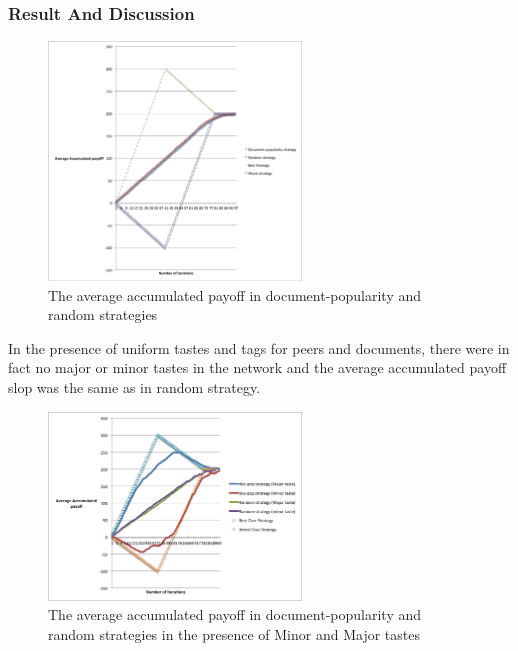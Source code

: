\documentclass [12pt]{article} \usepackage{multicol}
\begin{document}
\subsubsection{Result And Discussion}

\begin{figure}[h!]
\begin{center}
\includegraphics[width=0.6\textwidth,center]{images/doc-pop-rand-2taste}
\caption{The average accumulated payoff in document-popularity and random strategies}
\label{fig:images/EXP3-2}
\end{center}
\end{figure}

 In the presence of uniform tastes and tags for peers and documents, 
there were in fact no major or minor tastes in the network and the average accumulated payoff slop was the same as in random strategy. 

\begin{figure}[h!]
\begin{center}
\includegraphics[width=0.6\textwidth,center]{images/Exp4-doc-pop-and-random-MajorMinor}
\caption{The average accumulated payoff in document-popularity and random strategies in the presence of Minor and Major tastes}
\label{fig:images/EXP3-2}
\end{center}
\end{figure}
\end{document}
